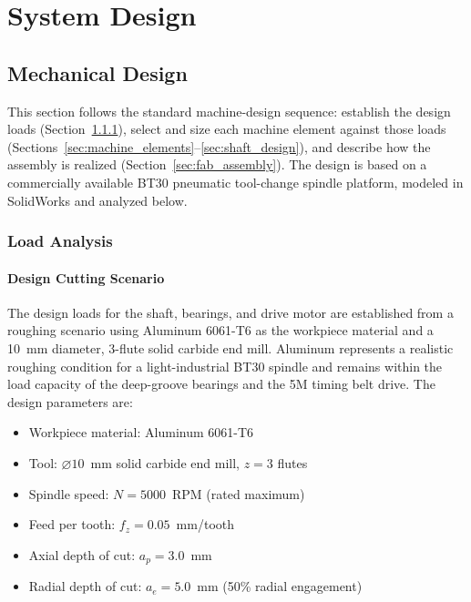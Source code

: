 \documentclass[12pt,a4paper]{report}
\begin{document}
	\chapter{System Design}
	
	\section{Mechanical Design}\label{sec:mech_design}
	This section follows the standard machine-design sequence: establish the design loads
	(Section~\ref{sec:load_analysis}), select and size each machine element against those loads
	(Sections~\ref{sec:machine_elements}--\ref{sec:shaft_design}), and describe how the assembly is realized
	(Section~\ref{sec:fab_assembly}). The design is based on a commercially available BT30
	pneumatic tool-change spindle platform, modeled in SolidWorks and analyzed below.
	
	\subsection{Load Analysis}\label{sec:load_analysis}
	
	\subsubsection{Design Cutting Scenario}\label{sec:baseline_cutting}
	The design loads for the shaft, bearings, and drive motor are established from a roughing
	scenario using Aluminum 6061-T6 as the workpiece material and a 10~mm diameter, 3-flute
	solid carbide end mill. Aluminum represents a realistic roughing condition for a
	light-industrial BT30 spindle and remains within the load capacity of the deep-groove
	bearings and the 5M timing belt drive. The design parameters are:
	
	\begin{itemize}
		\item Workpiece material: Aluminum 6061-T6
		\item Tool: $\varnothing 10$~mm solid carbide end mill, $z = 3$ flutes
		\item Spindle speed: $N = 5000$~RPM (rated maximum)
		\item Feed per tooth: $f_z = 0.05$~mm/tooth
		\item Axial depth of cut: $a_p = 3.0$~mm
		\item Radial depth of cut: $a_e = 5.0$~mm (50\% radial engagement)
	\end{itemize}
	
\end{document}
